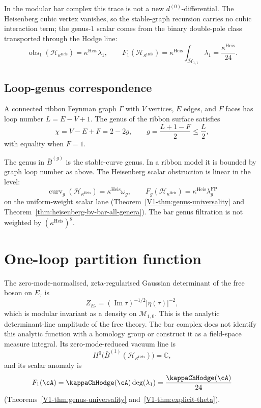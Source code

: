 \begin{center}
\end{center}

In the modular bar complex this trace is not a new
$d^{(0)}$-differential.  The Heisenberg cubic vertex vanishes, so the
stable-graph recursion carries no cubic interaction term; the genus-$1$
scalar comes from the binary double-pole class transported through
the Hodge line:
\[
\operatorname{obs}_1(\mathcal{H}_{\kappa^{\mathrm{Heis}}})
= \kappa^{\mathrm{Heis}}\lambda_1,\qquad
F_1(\mathcal{H}_{\kappa^{\mathrm{Heis}}})
= \kappa^{\mathrm{Heis}}
\int_{\overline{\mathcal{M}}_{1,1}}\lambda_1
= \frac{\kappa^{\mathrm{Heis}}}{24}.
\]

\subsection{Loop-genus correspondence}

\begin{theorem}
\label{thm:loop-genus-correspondence}
A connected ribbon Feynman graph $\Gamma$ with $V$ vertices, $E$ edges,
and $F$ faces has loop number $L=E-V+1$.  The genus of the ribbon
surface satisfies
\[
\chi=V-E+F=2-2g,\qquad
g=\frac{L+1-F}{2}\leq \frac{L}{2},
\]
with equality when $F=1$.
\end{theorem}

The genus in $\bar{B}^{(g)}$ is the stable-curve genus.  In a ribbon
model it is bounded by graph loop number as above. The
Heisenberg scalar obstruction is linear in the level:
\[
\operatorname{curv}_g(\mathcal{H}_{\kappa^{\mathrm{Heis}}})
= \kappa^{\mathrm{Heis}}\omega_g,\qquad
F_g(\mathcal{H}_{\kappa^{\mathrm{Heis}}})
= \kappa^{\mathrm{Heis}}\lambda_g^{\mathrm{FP}}
\]
on the uniform-weight scalar lane
(Theorem~\ref{V1-thm:genus-universality} and
Theorem~\ref{thm:heisenberg-bv-bar-all-genera}).  The bar genus
filtration is not weighted by
$(\kappa^{\mathrm{Heis}})^g$.

\section{One-loop partition function}

The zero-mode-normalised, zeta-regularised Gaussian determinant of the
free boson on $E_\tau$ is
\[
Z_{E_\tau}=(\operatorname{Im}\tau)^{-1/2}|\eta(\tau)|^{-2},
\]
which is modular invariant as a density on $\mathcal{M}_{1,0}$.  This
is the analytic determinant-line amplitude of the free theory. The bar
complex does not identify this analytic function with a homology group
or construct it as a field-space measure integral.  Its
zero-mode-reduced vacuum line is
\[
H^0\bigl(\bar{B}^{(1)}
(\mathcal{H}_{\kappa^{\mathrm{Heis}}})\bigr)=\mathbb{C},
\]
and its scalar anomaly is
\[
F_1(\cA)=\kappaChHodge(\cA)\deg(\lambda_1)=\frac{\kappaChHodge(\cA)}{24}
\]
(Theorems~\ref{V1-thm:genus-universality}
and~\ref{V1-thm:explicit-theta}).

